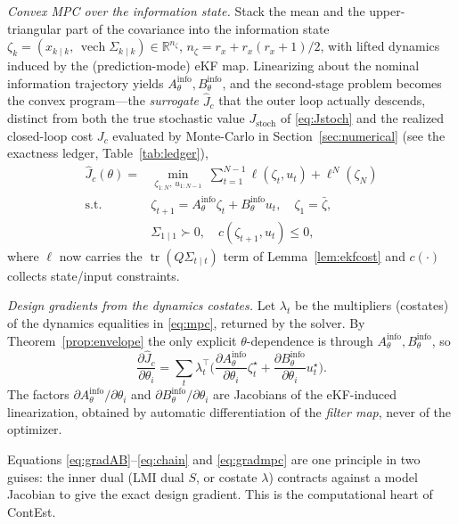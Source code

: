 \documentclass[twocolumn,amsthm]{autart}
\begin{document}
\emph{Convex MPC over the information state.} Stack the mean and the
upper-triangular part of the covariance into the information state
$\zeta_k = (x_{k\mid k},\, \operatorname{vech}\Sigma_{k\mid k}) \in
\mathbb{R}^{n_\zeta}$, $n_\zeta = r_x + r_x(r_x+1)/2$, with lifted dynamics
induced by the (prediction-mode) eKF map. Linearizing about the nominal
information trajectory yields $A_\theta^{\mathrm{info}}, B_\theta^{\mathrm{info}}$,
and the second-stage problem becomes the convex program---the \emph{surrogate}
$\widehat J_c$ that the outer loop actually descends, distinct from both the true
stochastic value $J_{\mathrm{stoch}}$ of \eqref{eq:Jstoch} and the realized
closed-loop cost $J_c$ evaluated by Monte-Carlo in Section~\ref{sec:numerical}
(see the exactness ledger, Table~\ref{tab:ledger}),
\begin{equation}\label{eq:mpc}
\begin{aligned}
\widehat J_c(\theta) = &\min_{\zeta_{1:N},\, u_{1:N-1}}\
\sum_{t=1}^{N-1} \ell(\zeta_t,u_t) + \ell^N(\zeta_N)\\
\text{s.t. } & \zeta_{t+1} = A_\theta^{\mathrm{info}}\zeta_t +
B_\theta^{\mathrm{info}} u_t,\quad \zeta_1 = \bar\zeta,\\
& \Sigma_{1\mid 1} \succ 0,\quad c(\zeta_{t+1},u_t) \le 0,
\end{aligned}
\end{equation}
where $\ell$ now carries the $\operatorname{tr}(Q\Sigma_{t\mid t})$ term of
Lemma~\ref{lem:ekfcost} and $c(\cdot)$ collects state/input constraints.

\emph{Design gradients from the dynamics costates.} Let $\lambda_t$ be the
multipliers (costates) of the dynamics equalities in \eqref{eq:mpc}, returned by
the solver. By Theorem~\ref{prop:envelope} the only explicit
$\theta$-dependence is through $A_\theta^{\mathrm{info}}, B_\theta^{\mathrm{info}}$,
so
\begin{equation}\label{eq:gradmpc}
\frac{\partial \widehat J_c}{\partial \theta_i} = \sum_t \lambda_t^\top \Big(
\frac{\partial A_\theta^{\mathrm{info}}}{\partial \theta_i}\zeta_t^\star +
\frac{\partial B_\theta^{\mathrm{info}}}{\partial \theta_i} u_t^\star \Big).
\end{equation}
The factors $\partial A_\theta^{\mathrm{info}}/\partial\theta_i$ and
$\partial B_\theta^{\mathrm{info}}/\partial\theta_i$ are Jacobians of the
eKF-induced linearization, obtained by automatic differentiation of the
\emph{filter map}, never of the optimizer.

\begin{rem}
Equations \eqref{eq:gradAB}--\eqref{eq:chain} and \eqref{eq:gradmpc} are one
principle in two guises: the inner dual (LMI dual $S$, or costate $\lambda$)
contracts against a model Jacobian to give the exact design gradient. This is the
computational heart of ContEst.
\end{rem}
\end{document}
